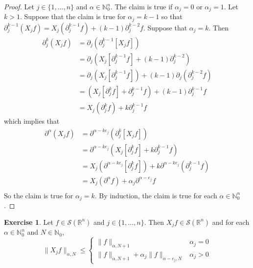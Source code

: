 \documentclass[12pt]{amsart}
\theoremstyle{definition}
\newtheorem{ex}[definition]{Exercise}
\newcommand{\p}{\partial}
\newcommand{\al}{\alpha}
\newcommand{\N}{\mathbb{N}}
\newcommand{\R}{\mathbb{R}}
\newcommand{\MS}{\mathcal{S}}
\begin{document}
	\begin{proof}
		Let $j \in \{1, \ldots, n\}$ and $\al \in \N_0^n$. The claim is true if $\al_j = 0$ or $\al _j = 1$.  Let $k > 1$. Suppose that the claim is true for $\al_j = k - 1$ so that $\p_j^{k-1}(X_jf)= X_j(\p_j^{k-1}f) + (k - 1) \p_j^{k-2} f$. Suppose that $\al_j = k$. Then 
		\begin{align*}
			\p_j^{k} (X_j f)
			&= \p_j (\p_j^{k-1} [X_jf]) \\
			&= \p_j (X_j[\p_j^{k-1}f] + (k - 1) \p_j^{k-2}) \\
			&= \p_j (X_j[\p_j^{k-1}f]) + (k - 1) \p_j( \p_j^{k-2} f) \\
			&= (X_j [\p_j^{k}f] + \p_j^{k-1}f)  + (k -1) \p_j^{k-1}f \\
			&= X_j (\p_j^{k}f) + k \p_j^{k-1}f
		\end{align*}
		which implies that  
		\begin{align*}
			\p^{\al}(X_j f) 
			& = \p^{\al - k e_j} (\p_j^{k} [X_j f]) \\
			& = \p^{\al - k e_j} (X_j [\p_j^{k}f] + k \p_j^{k-1}f) \\
			& = X_j (\p^{\al - k e_j}[\p_j^k f]) +  k \p^{\al - k e_j} (\p_j^{k-1}f) \\
			& = X_j(\p^{\al} f) + \al_j \p^{\al - e_j} f \\
		\end{align*}
		So the claim is true for $\al_j = k$. By induction, the claim is true for each $\al \in \N_0^n$. 
	\end{proof}
	
	\begin{ex}
		Let $f \in \MS(\R^n)$ and $j \in \{1, \ldots, n\}$. Then $X_jf \in \MS(\R^n)$ and for each $\al \in \N_0^n$ and $N \in \N_0$, 
		\[
		\|X_jf \|_{\al, N} \leq 
		\begin{cases}
			\|f\|_{\al, N+1} & \al_j = 0 \\
			\|f\|_{\al, N+1} + \al_j \|f\|_{\al - e_j, N} & \al_j > 0
		\end{cases}
		\] 
	\end{ex}
	
\end{document}
